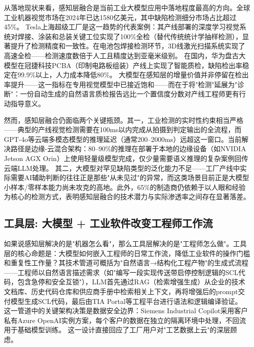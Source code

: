 \documentclass[12pt,a4paper]{ctexart}
\begin{document}
从落地现状来看，感知层融合是当前工业大模型应用中落地程度最高的方向。全球工业机器视觉市场在2024年已达1580亿美元，其中缺陷检测细分市场占比超过45\%。\cite{voxel51whitepaper2025} Tesla上海超级工厂是这一趋势的代表案例：其产线部署的深度学习视觉系统对焊接、涂装和总装关键工位实现了100\%全检（替代传统统计学抽样检测），显著提升了检测精度和一致性。在电池包焊接检测环节，3D线激光扫描系统实现了高速全检——检测速度数倍于人工且精度达到亚毫米级别。\cite{blockchain2025tesla} 在国内，华为盘古大模型在冠捷科技PCBA（印制电路板组装）产线上实现了智能质检，缺陷检出率稳定在99.9\%以上，人力成本降低80\%。\cite{huawei2025pangu} 大模型在感知层的增量价值并非停留在检出率提升——这一指标在专用视觉模型中已接近饱和——而在于将"检测"延展为"诊断"：一份自动生成的自然语言质检报告远比一个置信度分数对产线工程师更有行动指导意义。

然而，感知层融合仍面临两个关键瓶颈。其一，工业检测的实时性约束相当严格——典型的产线视觉检测需要在100ms以内完成从拍摄到判定输出的全流程，而GPT-4o等云端多模态模型的推理延迟（通常200--2000ms）远超这一窗口。当前解决路径是边缘-云混合架构：80--90\%的推理在部署于本地的边缘设备（如NVIDIA Jetson AGX Orin）上使用轻量级模型完成，仅少量需要语义推理的复杂案例回传云端LLM处理。\cite{jisem2025cvzerodefect} 其二，大模型对罕见缺陷类型的泛化能力不足——工厂产线中实际需要AI辅助判断的往往正是那些"从未见过"的异常，而这类场景目前正是大模型小样本/零样本能力尚未攻克的高地。此外，65\%的制造商仍依赖于以人眼和经验为核心的检测方式\cite{voxel51whitepaper2025}，表明感知层融合的技术潜力与实际渗透率之间存在显著落差。

\subsection{工具层: 大模型 + 工业软件改变工程师工作流}

如果说感知层解决的是"机器怎么看"，那么工具层解决的是"工程师怎么做"。工具层的核心命题是：大模型如何嵌入工程师的日常工作流，降低工业软件的操作门槛和重复性工作量？其技术管道可概括为"自然语言→结构化工程产物"的生成式流程——工程师以自然语言描述需求（如"编写一段实现传送带启停控制逻辑的SCL代码，包含急停和安全互锁"），LLM首先通过RAG（检索增强生成）从企业的技术文档库、历史代码仓库和供应商手册中检索相关上下文，再将增强后的prompt交付模型生成SCL代码，最后由TIA Portal等工程平台进行语法和逻辑编译验证。\cite{jms2025ifm} 这一管道中的关键架构决策是数据安全边界：Siemens Industrial Copilot采用客户私有Azure OpenAI实例方案，每个客户的数据在独立的隔离环境中处理，不回流用于基础模型训练。\cite{siemens2024press} 这一设计直接回应了工厂用户对"工艺数据上云"的深层顾虑。
\end{document}

